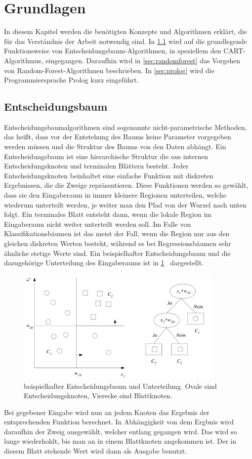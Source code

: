 \section{Grundlagen}
In diesem Kapitel werden die benötigten Konzepte und Algorithmen erklärt, die für das Verständnis der Arbeit notwendig sind.
In \cref{sec:entscheidungsbaum} wird auf die grundlegende Funktionsweise von Entscheidungsbaum-Algorithmen, in speziellem den CART-Algorithmus, eingegangen.
Daraufhin wird in \cref{sec:randomforest} das Vorgehen von Random-Forest-Algorithmen beschrieben. In \cref{sec:prolog}
wird die Programmiersprache Prolog kurz eingeführt.


\subsection{Entscheidungsbaum} \label{sec:entscheidungsbaum}
Entscheidungsbaumalgorithmen sind sogenannte nicht-parametrische Methoden, das heißt, dass vor der
Entstehung des Baums keine Parameter vorgegeben werden müssen und die Struktur des Baums von den Daten abhängt.
Ein Entscheidungsbaum ist eine hierarchische Struktur die aus internen Entscheidungsknoten und terminalen Blättern besteht.
Jeder Entscheidungsknoten beinhaltet eine einfache Funktion mit diskreten Ergebnissen, die die Zweige repräsentieren.
Diese Funktionen werden so gewählt, dass sie den Eingaberaum in immer kleinere Regionen unterteilen, welche wiederum
unterteilt werden, je weiter man den Pfad von der Wurzel nach unten folgt.
Ein terminales Blatt entsteht dann, wenn die lokale Region im Eingaberaum nicht weiter unterteilt werden soll.
Im Falle von Klassifikationsbäumen ist das meist der Fall, wenn die Region nur aus den gleichen diskreten Werten besteht,
während es bei Regressionsbäumen sehr ähnliche stetige Werte sind.
Ein beispielhafter Entscheidungsbaum und die dazugehörige Unterteilung des Eingaberaums ist in \cref{fig:baum}~\cite{Alpaydin+2022} dargestellt.
\begin{figure}[h]
  \centering
  \includegraphics[width=10cm]{fig/baum.png}
  \caption{beispielhafter Entscheidungsbaum und Unterteilung. Ovale sind Entscheidungsknoten, Vierecke sind Blattknoten.}%
  \label{fig:baum}
\end{figure}
Bei gegebener Eingabe wird nun an jedem Knoten das Ergebnis der entsprechenden Funktion berechnet. In Abhängigkeit von dem Ergbnis
wird daraufhin der Zweig ausgewählt, welcher entlang gegangen wird. Das wird so lange wiederhohlt, bis man an in einem
Blattknoten angekommen ist. Der in diesem Blatt stehende Wert wird dann als Ausgabe benutzt.

